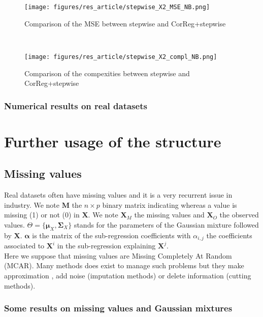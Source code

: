 \documentclass[12pt,a4paper]{report}
\begin{document}
 \begin{figure}[h!]
	\begin{minipage}[l]{.48\linewidth}
			\texttt{[image: figures/res\_article/stepwise\_X2\_MSE\_NB.png]} 
			\caption{Comparison of the MSE between stepwise and CorReg+stepwise}
	\end{minipage} \
   \begin{minipage}[r]{.48\linewidth}
			\texttt{[image: figures/res\_article/stepwise\_X2\_compl\_NB.png]} 
			\caption{Comparison of the compexities between stepwise and CorReg+stepwise}
   \end{minipage}
\end{figure}

\section{Numerical results on real datasets} \label{sectionrealcase}


\part{Further usage of the structure}	
\chapter{Missing values}
	Real datasets often have missing values and it is a very recurrent issue in industry. We note $\boldsymbol{M}$ the $n\times p$ binary matrix indicating whereas a value is missing (1) or not (0) in $\boldsymbol{X}$.
	We note $\boldsymbol{X}_M$ the missing values and $\boldsymbol{X}_{O}$ the observed values. $\Theta=\{\boldsymbol{\mu}_X,\boldsymbol{\Sigma}_X \}$ stands for the parameters of the Gaussian mixture followed by $\boldsymbol{X}$.
	$\boldsymbol{\alpha}$ is the matrix of the sub-regression coefficients with $\alpha_{i,j}$ the coefficients associated to $\boldsymbol{X}^i$ in the sub-regression explaining $\boldsymbol{X}^j$.\\ 
			Here we suppose that missing values are Missing Completely At Random (MCAR). 
	 Many methods does exist to manage such problems \cite{little1992regression} but they make approximation , add noise (imputation methods) or delete information (cutting methods).	
\section{Some results on missing values and Gaussian mixtures}
\end{document}
